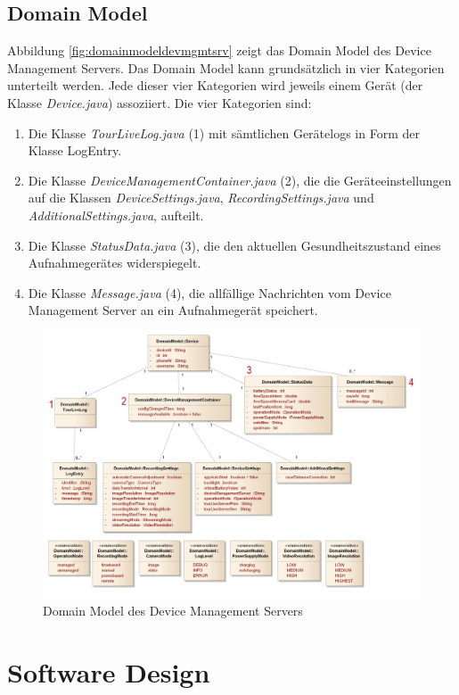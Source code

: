 \subsection{Domain Model}
Abbildung \ref{fig:domainmodeldevmgmtsrv} zeigt das Domain Model des Device Management Servers. Das Domain Model kann grundsätzlich in vier Kategorien unterteilt werden. Jede dieser vier Kategorien wird jeweils einem Gerät (der Klasse \textit{Device.java}) assoziiert. Die vier Kategorien sind: 


\begin{enumerate}
\item Die Klasse \textit{TourLiveLog.java} (1) mit sämtlichen Gerätelogs in Form der Klasse LogEntry. 
\item Die Klasse \textit{DeviceManagementContainer.java} (2), die die Geräteeinstellungen auf die Klassen \textit{DeviceSettings.java}, \textit{RecordingSettings.java} und \textit{AdditionalSettings.java}, aufteilt.
\item Die Klasse \textit{StatusData.java} (3), die den aktuellen Gesundheitszustand eines Aufnahmegerätes widerspiegelt.
\item Die Klasse \textit{Message.java} (4), die allfällige Nachrichten vom Device Management Server an ein Aufnahmegerät speichert.
\end{enumerate}

\label{fig:domainmodeldevmgmtsrv}
\begin{figure}[H]
	\centering
	\includegraphics[width=130mm]{images/devmgmtsrv/domainmodel.jpg}
	\caption{Domain Model des Device Management Servers}
\end{figure}


\section{Software Design}
